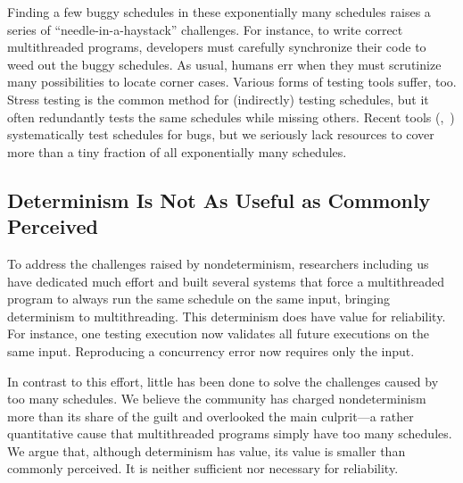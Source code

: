 
Finding a few buggy schedules in these exponentially many schedules raises
a series of ``needle-in-a-haystack'' challenges.  For instance, to write
correct multithreaded programs, developers must carefully synchronize
their code to weed out the buggy schedules.  As usual, humans err when
they must scrutinize many possibilities to locate corner cases. Various
forms of testing tools suffer, too.  Stress testing is the common method
for (indirectly) testing schedules, but it often redundantly tests the
same schedules while missing others.  Recent tools
(\eg,~\cite{musuvathi:chess:osdi08}) systematically test
schedules for bugs, but we seriously lack resources to cover more than a tiny
fraction of all exponentially many schedules.

\subsection{Determinism Is Not As Useful as Commonly Perceived}

To address the challenges raised by nondeterminism, researchers including
us have dedicated much effort and built several systems that force a
multithreaded program to always run the same schedule on the same input,
bringing determinism to multithreading.  This determinism does have value
for reliability.  For instance, one testing execution now validates all
future executions on the same input.  Reproducing a concurrency error now
requires only the input.

In contrast to this effort, little has been done to solve the
challenges caused by too many schedules.  We believe
the community has charged nondeterminism more than its share of the guilt
and overlooked the main culprit---a rather quantitative cause that
multithreaded programs simply have too many schedules.
We argue that, although determinism has value, its value
is smaller than commonly perceived.  It is neither sufficient nor
necessary for reliability.


